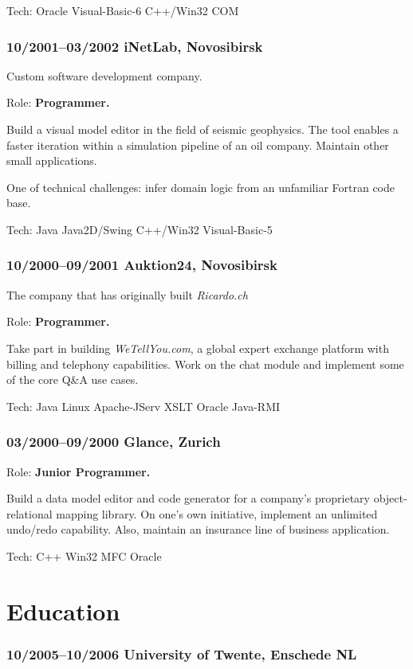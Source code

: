 \documentclass[a4paper, twocolumn, 10pt]{article}
\begin{document}
Tech: Oracle Visual-Basic-6 C++/Win32 COM

\subsubsection*{10/2001--03/2002 iNetLab, Novosibirsk}

Custom software development company.

Role: \textbf{Programmer.}

Build a visual model editor in the field of seismic geophysics. The tool enables a faster iteration
within a simulation pipeline of an oil company. Maintain other small applications.

One of technical challenges: infer domain logic from an unfamiliar Fortran code base.

Tech: Java Java2D/Swing C++/Win32 Visual-Basic-5

\subsubsection*{10/2000--09/2001 Auktion24, Novosibirsk}

The company that has originally built \emph{Ricardo.ch}

Role: \textbf{Programmer.}

Take part in building \emph{WeTellYou.com}, a global expert exchange platform with billing and
telephony capabilities. Work on the chat module and implement some of the core Q\&A use cases.

Tech: Java Linux Apache-JServ XSLT Oracle Java-RMI

\subsubsection*{03/2000--09/2000 Glance, Zurich}

Role: \textbf{Junior Programmer.}

Build a data model editor and code generator for a company's proprietary object-relational mapping
library. On one's own initiative, implement an unlimited undo/redo capability. Also, maintain an
insurance line of business application.

Tech: C++ Win32 MFC Oracle

\section*{Education}

\subsubsection*{10/2005--10/2006 University of Twente, Enschede NL}
\end{document}
